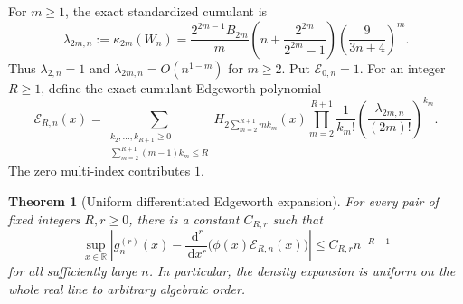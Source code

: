 \documentclass[11pt,oneside]{article}
\newtheorem{theorem}{Theorem}[section]
\theoremstyle{definition}
\theoremstyle{remark}
\newcommand{\R}{\mathbb{R}}
\newcommand{\dd}{\,\mathrm{d}}
\begin{document}
For \(m\ge1\), the exact standardized cumulant is
\begin{equation}
 \lambda_{2m,n}:=\kappa_{2m}(W_n)
 =\frac{2^{2m-1}B_{2m}}{m}
 \left(n+\frac{2^{2m}}{2^{2m}-1}\right)
 \left(\frac9{3n+4}\right)^m.
 \label{eq:lambda-2m-n}
\end{equation}
Thus \(\lambda_{2,n}=1\) and \(\lambda_{2m,n}=O(n^{1-m})\) for \(m\ge2\).
Put \(\mathcal E_{0,n}=1\).  For an integer \(R\ge1\), define the exact-cumulant Edgeworth polynomial
\begin{equation}
 \mathcal E_{R,n}(x)=
 \sum_{\substack{k_2,\ldots,k_{R+1}\ge0\\
      \sum_{m=2}^{R+1}(m-1)k_m\le R}}
 H_{2\sum_{m=2}^{R+1}mk_m}(x)
 \prod_{m=2}^{R+1}\frac1{k_m!}
 \left(\frac{\lambda_{2m,n}}{(2m)!}\right)^{k_m}.
 \label{eq:edgeworth-polynomial}
\end{equation}
The zero multi-index contributes \(1\).

\begin{theorem}[Uniform differentiated Edgeworth expansion]
\label{thm:fup-all-orders-edgeworth}
For every pair of fixed integers \(R,r\ge0\), there is a constant \(C_{R,r}\) such that
\begin{equation}
 \sup_{x\in\R}
 \left|g_n^{(r)}(x)-\frac{\dd^r}{\dd x^r}
       \bigl(\phi(x)\mathcal E_{R,n}(x)\bigr)\right|
 \le C_{R,r}n^{-R-1}
 \label{eq:edgeworth-uniform-derivative}
\end{equation}
for all sufficiently large \(n\).  In particular, the density expansion is uniform on the
whole real line to arbitrary algebraic order.
\end{theorem}
\end{document}
